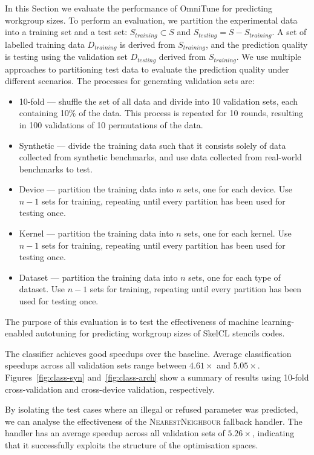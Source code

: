 \documentclass[nonatbib,preprint,9pt]{sigplanconf}
\begin{document}
In this Section we evaluate the performance of OmniTune for predicting
workgroup sizes. To perform an evaluation, we partition the
experimental data into a training set and a test set:
$S_{training} \subset S$ and $S_{testing} = S - S_{training}$. A set
of labelled training data $D_{training}$ is derived from
$S_{training}$, and the prediction quality is testing using the
validation set $D_{testing}$ derived from $S_{training}$. We use
multiple approaches to partitioning test data to evaluate the
prediction quality under different scenarios. The processes for
generating validation sets are:
%
\begin{itemize}
\item 10-fold --- shuffle the set of all data and divide into 10
  validation sets, each containing 10\% of the data. This process is
  repeated for 10 rounds, resulting in 100 validations of 10
  permutations of the data.
\item Synthetic --- divide the training data such that it consists
  solely of data collected from synthetic benchmarks, and use data
  collected from real-world benchmarks to test.
\item Device --- partition the training data into $n$ sets, one for
  each device. Use $n-1$ sets for training, repeating until every
  partition has been used for testing once.
\item Kernel --- partition the training data into $n$ sets, one for
  each kernel. Use $n-1$ sets for training, repeating until every
  partition has been used for testing once.
\item Dataset --- partition the training data into $n$ sets, one for
  each type of dataset. Use $n-1$ sets for training, repeating until
  every partition has been used for testing once.
\end{itemize}

The purpose of this evaluation is to test the effectiveness of machine
learning-enabled autotuning for predicting workgroup sizes of SkelCL
stencils codes.

The classifier achieves good speedups over the baseline. Average
classification speedups across all validation sets range between
$4.61\times$ and $5.05\times$. Figures~\ref{fig:class-syn}
and~\ref{fig:class-arch} show a summary of results using 10-fold
cross-validation and cross-device validation, respectively.

By isolating the test cases where an illegal or refused parameter was
predicted, we can analyse the effectiveness of the
\textsc{NearestNeighbour} fallback handler. The handler has an average
speedup across all validation sets of $5.26\times$, indicating that it
successfully exploits the structure of the optimisation spaces.
\end{document}
